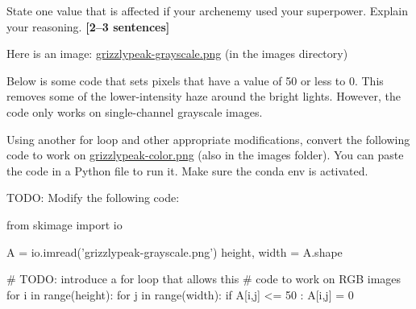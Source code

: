 \documentclass{csci1430}
\begin{document}
\begin{answer}[height=7]

\end{answer}


\begin{subsubquestion}[points=3]
State one value that is affected if your archenemy used your superpower. Explain your reasoning. \textbf{[2--3 sentences]}
\end{subsubquestion}
    
\begin{answer}[height=7]

\end{answer}

\pagebreak %

\begin{question}[points=6,drawbox=false]
Here is an image: \href{run:images/grizzlypeak-grayscale.png}{grizzlypeak-grayscale.png} (in the images directory)
\end{question}

\begin{subquestion}[drawbox=false]
Below is some code that sets pixels that have a value of 50 or less to 0. This removes some of the lower-intensity haze around the bright lights. However, the code only works on single-channel grayscale images.
\end{subquestion}

\begin{subsubquestion}[points=2]
Using another for loop and other appropriate modifications, convert the following code to work on \href{run:images/grizzlypeak-color.png}{grizzlypeak-color.png} (also in the images folder). You can paste the code in a Python file to run it. Make sure the conda env is activated.
\end{subsubquestion}

\begin{answer}[height=20]

TODO: Modify the following code:
\begin{python}
from skimage import io

A = io.imread('grizzlypeak-grayscale.png')
height, width = A.shape

# TODO: introduce a for loop that allows this 
# code to work on RGB images
for i in range(height):
    for j in range(width):
        if A[i,j] <= 50 :
            A[i,j] = 0
\end{python}
    
\end{answer}
\end{document}
